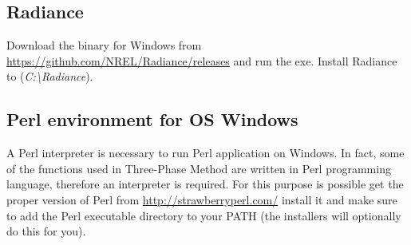 \subsection{Radiance}
Download the binary for Windows from \url{https://github.com/NREL/Radiance/releases} and run the exe. Install Radiance to (\textit{C:\textbackslash Radiance}).

\subsection{Perl environment for OS Windows}
A Perl interpreter is necessary to run Perl application on Windows. In fact, some of the functions used in Three-Phase Method are written in Perl programming language, therefore an interpreter is required. 
For this purpose is possible get the proper version of Perl from \url{http://strawberryperl.com/} install it and make sure to add the Perl executable directory to your PATH (the installers will optionally do this for you).

